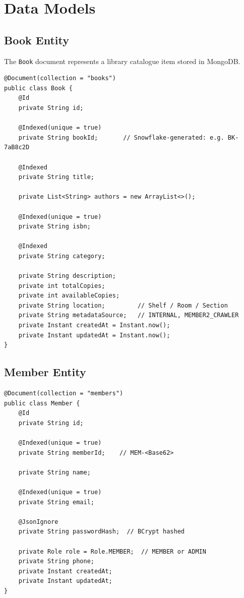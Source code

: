 \documentclass[12pt,a4paper]{report}
\begin{document}
\chapter{Data Models}

\section{Book Entity}
The \texttt{Book} document represents a library catalogue item stored in MongoDB.

\begin{lstlisting}[style=JavaStyle, caption={Book.java -- MongoDB Document Entity}]
@Document(collection = "books")
public class Book {
    @Id
    private String id;

    @Indexed(unique = true)
    private String bookId;       // Snowflake-generated: e.g. BK-7aB8c2D

    @Indexed
    private String title;

    private List<String> authors = new ArrayList<>();

    @Indexed(unique = true)
    private String isbn;

    @Indexed
    private String category;

    private String description;
    private int totalCopies;
    private int availableCopies;
    private String location;         // Shelf / Room / Section
    private String metadataSource;   // INTERNAL, MEMBER2_CRAWLER
    private Instant createdAt = Instant.now();
    private Instant updatedAt = Instant.now();
}
\end{lstlisting}

\section{Member Entity}
\begin{lstlisting}[style=JavaStyle, caption={Member.java -- User Account Document}]
@Document(collection = "members")
public class Member {
    @Id
    private String id;

    @Indexed(unique = true)
    private String memberId;    // MEM-<Base62>

    private String name;

    @Indexed(unique = true)
    private String email;

    @JsonIgnore
    private String passwordHash;  // BCrypt hashed

    private Role role = Role.MEMBER;  // MEMBER or ADMIN
    private String phone;
    private Instant createdAt;
    private Instant updatedAt;
}
\end{lstlisting}
\end{document}
